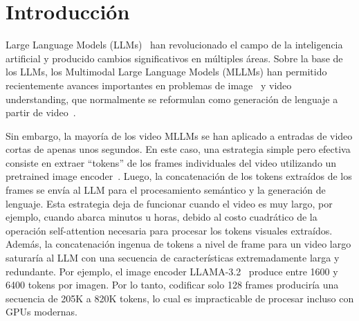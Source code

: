 
\section{Introducción}
\label{sec:intro}

Large Language Models (LLMs)~\cite{brown2020language,ouyang2022training,chatgpt,achiam2023gpt,vicuna2023,touvron2023llama2,dubey2024llama,jiang2024mixtral} han revolucionado el campo de la inteligencia artificial y producido cambios significativos en múltiples áreas. Sobre la base de los LLMs, los Multimodal Large Language Models (MLLMs) han permitido recientemente avances importantes en problemas de image~\cite{alayrac2022flamingo,bai2023qwen,chen2023internvl,dong2024internlm,li2023blip2,zhu2023minigpt,liu2024visual,liu2023improved,huang2024lita,ye2023mplugowl, li2024llava,  li2024llavanext-interleave, llama3.2} y video understanding, que normalmente se reformulan como generación de lenguaje a partir de video~\cite{chen2023videollm, lin2023video, li2023videochat, li2023mvbench, liu2024world, Maaz2023VideoChatGPT, wang2024internvideo2, zhang2023video, rawal2024cinepile}.

Sin embargo, la mayoría de los video MLLMs se han aplicado a entradas de video cortas de apenas unos segundos. En este caso, una estrategia simple pero efectiva consiste en extraer ``tokens'' de los frames individuales del video utilizando un pretrained image encoder~\cite{llama3.2, ataallah2024minigpt4, liu2024visual, li2024llava, wang2024tarsier, li2024llavanext-interleave}. Luego, la concatenación de los tokens extraídos de los frames se envía al LLM para el procesamiento semántico y la generación de lenguaje. Esta estrategia deja de funcionar cuando el video es muy largo, por ejemplo, cuando abarca minutos u horas, debido al costo cuadrático de la operación self-attention necesaria para procesar los tokens visuales extraídos. Además, la concatenación ingenua de tokens a nivel de frame para un video largo saturaría al LLM con una secuencia de características extremadamente larga y redundante. Por ejemplo, el image encoder LLAMA-3.2~\cite{llama3.2} produce entre 1600 y 6400 tokens por imagen. Por lo tanto, codificar solo 128 frames produciría una secuencia de 205K a 820K tokens, lo cual es impracticable de procesar incluso con GPUs modernas.

